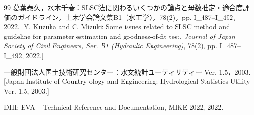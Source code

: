 \documentclass[jscefinal]{jjsce}
\begin{document}
\begin{thebibliography}{99}
葛葉泰久，水木千春：SLSC法に関わるいくつかの論点と母数推定・適合度評価のガイドライン，土木学会論文集B1（水工学），78(2)，pp. I\_487--I\_492，2022.
[Y. Kuzuha and C. Mizuki: Some issues related to SLSC method and guideline for parameter estimation and goodness-of-fit test, \textit{Journal of Japan Society of Civil Engineers, Ser. B1 (Hydraulic Engineering)}, 78(2), pp. I\_487--I\_492, 2022.]

一般財団法人国土技術研究センター：水文統計ユーティリティー Ver. 1.5，2003.
[Japan Institute of Country-ology and Engineering: Hydrological Statistics Utility Ver. 1.5, 2003.]

DHI: EVA -- Technical Reference and Documentation, MIKE 2022, 2022.

\end{thebibliography}
\end{document}
